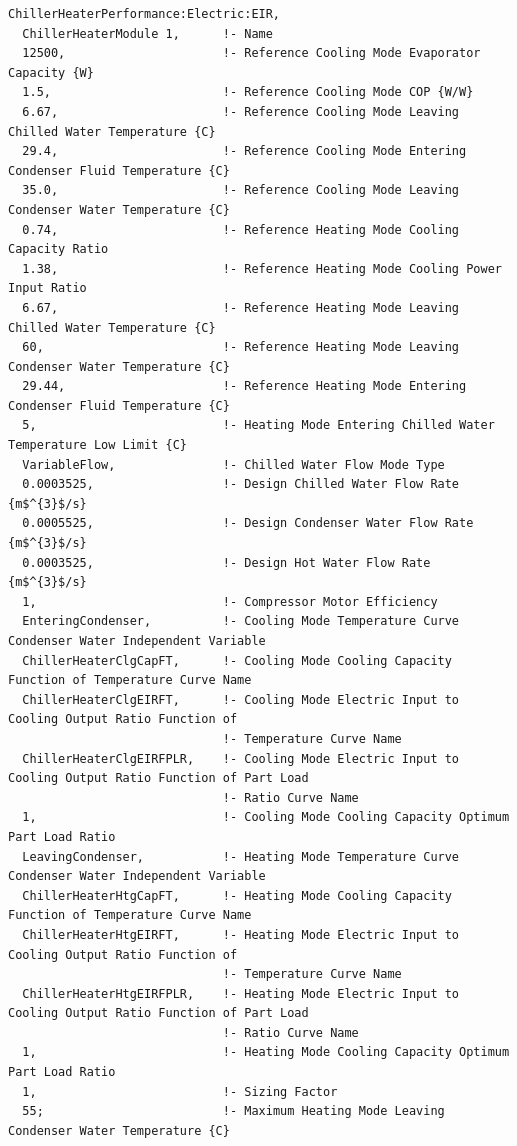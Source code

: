 \begin{lstlisting}
ChillerHeaterPerformance:Electric:EIR,
  ChillerHeaterModule 1,      !- Name
  12500,                      !- Reference Cooling Mode Evaporator Capacity {W}
  1.5,                        !- Reference Cooling Mode COP {W/W}
  6.67,                       !- Reference Cooling Mode Leaving Chilled Water Temperature {C}
  29.4,                       !- Reference Cooling Mode Entering Condenser Fluid Temperature {C}
  35.0,                       !- Reference Cooling Mode Leaving Condenser Water Temperature {C}
  0.74,                       !- Reference Heating Mode Cooling Capacity Ratio
  1.38,                       !- Reference Heating Mode Cooling Power Input Ratio
  6.67,                       !- Reference Heating Mode Leaving Chilled Water Temperature {C}
  60,                         !- Reference Heating Mode Leaving Condenser Water Temperature {C}
  29.44,                      !- Reference Heating Mode Entering Condenser Fluid Temperature {C}
  5,                          !- Heating Mode Entering Chilled Water Temperature Low Limit {C}
  VariableFlow,               !- Chilled Water Flow Mode Type
  0.0003525,                  !- Design Chilled Water Flow Rate {m$^{3}$/s}
  0.0005525,                  !- Design Condenser Water Flow Rate {m$^{3}$/s}
  0.0003525,                  !- Design Hot Water Flow Rate {m$^{3}$/s}
  1,                          !- Compressor Motor Efficiency
  EnteringCondenser,          !- Cooling Mode Temperature Curve Condenser Water Independent Variable
  ChillerHeaterClgCapFT,      !- Cooling Mode Cooling Capacity Function of Temperature Curve Name
  ChillerHeaterClgEIRFT,      !- Cooling Mode Electric Input to Cooling Output Ratio Function of
                              !- Temperature Curve Name
  ChillerHeaterClgEIRFPLR,    !- Cooling Mode Electric Input to Cooling Output Ratio Function of Part Load
                              !- Ratio Curve Name
  1,                          !- Cooling Mode Cooling Capacity Optimum Part Load Ratio
  LeavingCondenser,           !- Heating Mode Temperature Curve Condenser Water Independent Variable
  ChillerHeaterHtgCapFT,      !- Heating Mode Cooling Capacity Function of Temperature Curve Name
  ChillerHeaterHtgEIRFT,      !- Heating Mode Electric Input to Cooling Output Ratio Function of
                              !- Temperature Curve Name
  ChillerHeaterHtgEIRFPLR,    !- Heating Mode Electric Input to Cooling Output Ratio Function of Part Load
                              !- Ratio Curve Name
  1,                          !- Heating Mode Cooling Capacity Optimum Part Load Ratio
  1,                          !- Sizing Factor
  55;                         !- Maximum Heating Mode Leaving Condenser Water Temperature {C}
\end{lstlisting}

